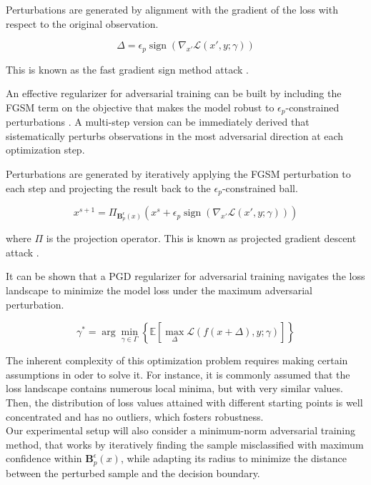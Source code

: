 \begin{attack}[FGSM]
    Perturbations are generated by alignment with the gradient of the 
    loss with respect to the original observation.
    
    $$
    \Delta = \epsilon_p \operatorname{sign}(\nabla_{x'} \mathcal{L}(x', y; \gamma))
    $$

    This is known as the fast gradient sign method attack
    \cite{goodfellowExplainingHarnessingAdversarial2015}.
\end{attack}

An effective regularizer for adversarial training can be built by 
including the FGSM term on the objective that makes the model robust 
to $\epsilon_p$-constrained perturbations \cite{goodfellowExplainingHarnessingAdversarial2015}. 
A multi-step version can be immediately derived that sistematically
perturbs observations in the most adversarial direction at each
optimization step.

\begin{attack}[PGD]
    Perturbations are generated by iteratively applying the FGSM
    perturbation to each step and projecting the result back to the
    $\epsilon_p$-constrained ball.

    $$
        x^{s+1} = \Pi_{\mathbf{B}_p^\epsilon(x)} \left ( x^s + \epsilon_p \operatorname{sign}(\nabla_{x'} \mathcal{L}(x', y; \gamma)) \right )
    $$

    where $\Pi$ is the projection operator. This is known as
    projected gradient descent attack
    \cite{madryDeepLearningModels2019}.
\end{attack}

It can be shown that a PGD regularizer for adversarial training navigates
the loss landscape to minimize the model loss under
the maximum adversarial perturbation.

$$
    \gamma^* = \arg \min_{\gamma \in \Gamma} \left \{ \mathbb{E} \left[ \max_{\Delta} \mathcal{L} (f(x + \Delta), y; \gamma) \right]  \right \}
$$

The inherent complexity of this optimization problem requires making
certain assumptions in oder to solve it. For instance, it is commonly
assumed that the loss landscape contains numerous local minima, but
with very similar values. Then, the distribution of loss values attained
with different starting points is well concentrated and has no outliers,
which fosters robustness.\\

Our experimental setup will also consider a minimum-norm 
adversarial training method, that works by iteratively finding the 
sample misclassified with maximum confidence within $\mathbf{B}_p^\epsilon(x)$,
while adapting its radius to minimize the distance between the perturbed
sample and the decision boundary.

